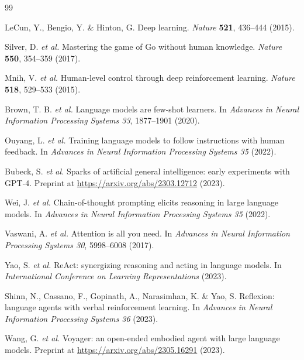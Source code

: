 \documentclass[11pt,a4paper]{article}
\begin{document}

\begin{thebibliography}{99}
\setlength{\itemsep}{0pt}

 LeCun, Y., Bengio, Y. \& Hinton, G.
Deep learning. \emph{Nature} \textbf{521}, 436--444 (2015).

 Silver, D. \emph{et al.}
Mastering the game of Go without human knowledge. \emph{Nature}
\textbf{550}, 354--359 (2017).

 Mnih, V. \emph{et al.} Human-level
control through deep reinforcement learning. \emph{Nature} \textbf{518},
529--533 (2015).

 Brown, T. B. \emph{et al.} Language
models are few-shot learners. In \emph{Advances in Neural Information
Processing Systems 33}, 1877--1901 (2020).

 Ouyang, L. \emph{et al.} Training
language models to follow instructions with human feedback. In
\emph{Advances in Neural Information Processing Systems 35} (2022).

 Bubeck, S. \emph{et al.} Sparks of
artificial general intelligence: early experiments with GPT-4. Preprint at
\url{https://arxiv.org/abs/2303.12712} (2023).

 Wei, J. \emph{et al.} Chain-of-thought
prompting elicits reasoning in large language models. In \emph{Advances in
Neural Information Processing Systems 35} (2022).

 Vaswani, A. \emph{et al.}
Attention is all you need. In \emph{Advances in Neural Information
Processing Systems 30}, 5998--6008 (2017).

 Yao, S. \emph{et al.} ReAct: synergizing
reasoning and acting in language models. In \emph{International Conference
on Learning Representations} (2023).

 Shinn, N., Cassano, F., Gopinath, A.,
Narasimhan, K. \& Yao, S. Reflexion: language agents with verbal
reinforcement learning. In \emph{Advances in Neural Information Processing
Systems 36} (2023).

 Wang, G. \emph{et al.} Voyager: an
open-ended embodied agent with large language models. Preprint at
\url{https://arxiv.org/abs/2305.16291} (2023).


\end{thebibliography}
\end{document}
